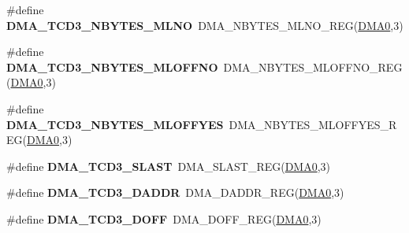 \begin{DoxyCompactItemize}
\item 
\#define {\bfseries D\+M\+A\+\_\+\+T\+C\+D3\+\_\+\+N\+B\+Y\+T\+E\+S\+\_\+\+M\+L\+NO}~D\+M\+A\+\_\+\+N\+B\+Y\+T\+E\+S\+\_\+\+M\+L\+N\+O\+\_\+\+R\+EG(\hyperlink{group__DMA__Peripheral__Access__Layer_ga4103044f9ca209772f513dc694513ffb}{D\+M\+A0},3)\hypertarget{group__DMA__Register__Accessor__Macros_ga19846e750847e4f60b1e73fed4224075}{}\label{group__DMA__Register__Accessor__Macros_ga19846e750847e4f60b1e73fed4224075}

\item 
\#define {\bfseries D\+M\+A\+\_\+\+T\+C\+D3\+\_\+\+N\+B\+Y\+T\+E\+S\+\_\+\+M\+L\+O\+F\+F\+NO}~D\+M\+A\+\_\+\+N\+B\+Y\+T\+E\+S\+\_\+\+M\+L\+O\+F\+F\+N\+O\+\_\+\+R\+EG(\hyperlink{group__DMA__Peripheral__Access__Layer_ga4103044f9ca209772f513dc694513ffb}{D\+M\+A0},3)\hypertarget{group__DMA__Register__Accessor__Macros_ga15bc0c9aad4d4aad6febd15eb31cc834}{}\label{group__DMA__Register__Accessor__Macros_ga15bc0c9aad4d4aad6febd15eb31cc834}

\item 
\#define {\bfseries D\+M\+A\+\_\+\+T\+C\+D3\+\_\+\+N\+B\+Y\+T\+E\+S\+\_\+\+M\+L\+O\+F\+F\+Y\+ES}~D\+M\+A\+\_\+\+N\+B\+Y\+T\+E\+S\+\_\+\+M\+L\+O\+F\+F\+Y\+E\+S\+\_\+\+R\+EG(\hyperlink{group__DMA__Peripheral__Access__Layer_ga4103044f9ca209772f513dc694513ffb}{D\+M\+A0},3)\hypertarget{group__DMA__Register__Accessor__Macros_gab3dd0db34f893d8115cc7bf6f0bd5a07}{}\label{group__DMA__Register__Accessor__Macros_gab3dd0db34f893d8115cc7bf6f0bd5a07}

\item 
\#define {\bfseries D\+M\+A\+\_\+\+T\+C\+D3\+\_\+\+S\+L\+A\+ST}~D\+M\+A\+\_\+\+S\+L\+A\+S\+T\+\_\+\+R\+EG(\hyperlink{group__DMA__Peripheral__Access__Layer_ga4103044f9ca209772f513dc694513ffb}{D\+M\+A0},3)\hypertarget{group__DMA__Register__Accessor__Macros_gae3a5b45233b7f24c770759413cbbb8bd}{}\label{group__DMA__Register__Accessor__Macros_gae3a5b45233b7f24c770759413cbbb8bd}

\item 
\#define {\bfseries D\+M\+A\+\_\+\+T\+C\+D3\+\_\+\+D\+A\+D\+DR}~D\+M\+A\+\_\+\+D\+A\+D\+D\+R\+\_\+\+R\+EG(\hyperlink{group__DMA__Peripheral__Access__Layer_ga4103044f9ca209772f513dc694513ffb}{D\+M\+A0},3)\hypertarget{group__DMA__Register__Accessor__Macros_ga00d0aa21f0dc3f9be0643931ee4af148}{}\label{group__DMA__Register__Accessor__Macros_ga00d0aa21f0dc3f9be0643931ee4af148}

\item 
\#define {\bfseries D\+M\+A\+\_\+\+T\+C\+D3\+\_\+\+D\+O\+FF}~D\+M\+A\+\_\+\+D\+O\+F\+F\+\_\+\+R\+EG(\hyperlink{group__DMA__Peripheral__Access__Layer_ga4103044f9ca209772f513dc694513ffb}{D\+M\+A0},3)\hypertarget{group__DMA__Register__Accessor__Macros_ga20dd71cc6246dba8d54263a5244d8462}{}\label{group__DMA__Register__Accessor__Macros_ga20dd71cc6246dba8d54263a5244d8462}


\end{DoxyCompactItemize}
